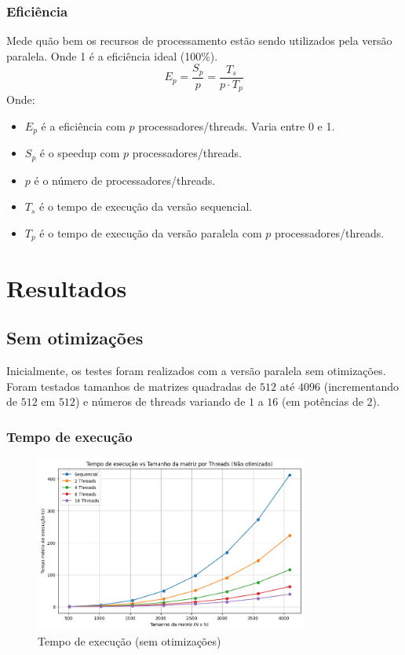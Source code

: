 \documentclass[12pt, a4paper]{article}
\begin{document}
	\subsubsection{Eficiência}
    Mede quão bem os recursos de processamento estão sendo utilizados pela versão paralela. Onde 1 é a eficiência ideal (100\%).
	\[
		E_{p} = \frac{S_{p}}{p}= \frac{T_{s}}{p \cdot T_{p}}
	\]
	Onde:
	\begin{itemize}
		\item $E_{p}$ é a eficiência com $p$ processadores/threads. Varia entre 0 e 1.

		\item $S_{p}$ é o speedup com $p$ processadores/threads.

        \item $p$ é o número de processadores/threads.

        \item $T_{s}$ é o tempo de execução da versão sequencial.

        \item $T_{p}$ é o tempo de execução da versão paralela com $p$ processadores/threads.
	\end{itemize}

	\newpage
	\section{Resultados}

	\subsection{Sem otimizações}

	Inicialmente, os testes foram realizados com a versão paralela sem otimizações. Foram testados 
	tamanhos de matrizes quadradas de $512$ até $4096$ (incrementando de $512$ em $512$) e números
	de threads variando de $1$ a $16$ (em potências de $2$).

	\subsubsection{Tempo de execução}

	\begin{figure}[H]
		\centering
		\includegraphics[width=0.8\textwidth]{img/execution-time.png}
		\caption{Tempo de execução (sem otimizações)}
		\label{fig:tempo_execucao}
	\end{figure}
\end{document}
